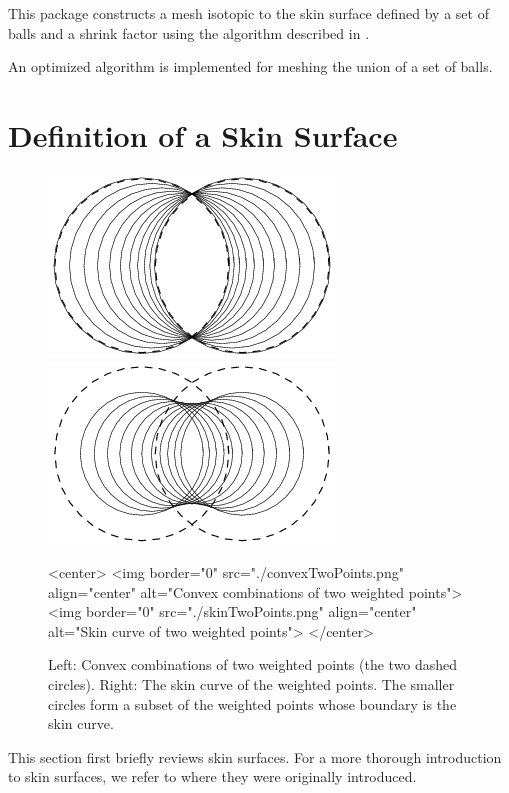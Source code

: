 This package constructs a mesh isotopic to the skin surface defined by
a set of balls and a shrink factor using the algorithm described in
\cite{cgal:kv-mssct-05}. %

An optimized algorithm is implemented for meshing the union of a set
of balls.

\section{Definition of a Skin Surface\label{sec:skindefinition}}

\begin{figure}
  \begin{ccTexOnly}
    \begin{center}
      \includegraphics[width=.25\textwidth]{Skin_surface_3/convexTwoPoints}
      \includegraphics[width=.25\textwidth]{Skin_surface_3/skinTwoPoints}
    \end{center}
  \end{ccTexOnly}
  \begin{ccHtmlOnly}
    <center>
    <img border="0" src="./convexTwoPoints.png" align="center" alt="Convex combinations of two weighted points">
    <img border="0" src="./skinTwoPoints.png" align="center" alt="Skin
    curve of two weighted points">
    </center>
  \end{ccHtmlOnly}
  \caption{\label{fig:twoPoints} Left: Convex combinations of two
    weighted points (the two dashed circles). Right: The skin curve of
    the weighted points. The smaller circles form a subset of the
    weighted points whose boundary is the skin curve.}
\end{figure}

This section first briefly reviews skin surfaces. For a more thorough
introduction to skin surfaces, we refer to \cite{cgal:e-dssd-99} where
they were originally introduced.

